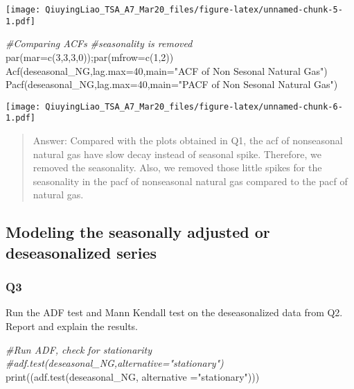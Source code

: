 \documentclass[
]{article}
\newenvironment{Shaded}{\begin{snugshade}}{\end{snugshade}}
\newcommand{\AttributeTok}[1]{\textcolor[rgb]{0.77,0.63,0.00}{#1}}
\newcommand{\CommentTok}[1]{\textcolor[rgb]{0.56,0.35,0.01}{\textit{#1}}}
\newcommand{\DecValTok}[1]{\textcolor[rgb]{0.00,0.00,0.81}{#1}}
\newcommand{\FunctionTok}[1]{\textcolor[rgb]{0.00,0.00,0.00}{#1}}
\newcommand{\NormalTok}[1]{#1}
\newcommand{\StringTok}[1]{\textcolor[rgb]{0.31,0.60,0.02}{#1}}
\begin{document}
\texttt{[image: QiuyingLiao\_TSA\_A7\_Mar20\_files/figure-latex/unnamed-chunk-5-1.pdf]}

\begin{Shaded}
\begin{Highlighting}[]
\CommentTok{\#Comparing ACFs}
\CommentTok{\#seasonality is removed}
\FunctionTok{par}\NormalTok{(}\AttributeTok{mar=}\FunctionTok{c}\NormalTok{(}\DecValTok{3}\NormalTok{,}\DecValTok{3}\NormalTok{,}\DecValTok{3}\NormalTok{,}\DecValTok{0}\NormalTok{));}\FunctionTok{par}\NormalTok{(}\AttributeTok{mfrow=}\FunctionTok{c}\NormalTok{(}\DecValTok{1}\NormalTok{,}\DecValTok{2}\NormalTok{))}
\FunctionTok{Acf}\NormalTok{(deseasonal\_NG,}\AttributeTok{lag.max=}\DecValTok{40}\NormalTok{,}\AttributeTok{main=}\StringTok{"ACF of Non Sesonal Natural Gas"}\NormalTok{)}
\FunctionTok{Pacf}\NormalTok{(deseasonal\_NG,}\AttributeTok{lag.max=}\DecValTok{40}\NormalTok{,}\AttributeTok{main=}\StringTok{"PACF of Non Sesonal Natural Gas"}\NormalTok{)}
\end{Highlighting}
\end{Shaded}

\texttt{[image: QiuyingLiao\_TSA\_A7\_Mar20\_files/figure-latex/unnamed-chunk-6-1.pdf]}

\begin{quote}
Answer: Compared with the plots obtained in Q1, the acf of nonseasonal
natural gas have slow decay instead of seasonal spike. Therefore, we
removed the seasonality. Also, we removed those little spikes for the
seasonality in the pacf of nonseasonal natural gas compared to the pacf
of natural gas.
\end{quote}

\hypertarget{modeling-the-seasonally-adjusted-or-deseasonalized-series}{%
\subsection{Modeling the seasonally adjusted or deseasonalized
series}\label{modeling-the-seasonally-adjusted-or-deseasonalized-series}}

\hypertarget{q3}{%
\subsubsection{Q3}\label{q3}}

Run the ADF test and Mann Kendall test on the deseasonalized data from
Q2. Report and explain the results.

\begin{Shaded}
\begin{Highlighting}[]
\CommentTok{\#Run ADF, check for stationarity}
\CommentTok{\#adf.test(deseasonal\_NG,alternative="stationary")}
\FunctionTok{print}\NormalTok{((}\FunctionTok{adf.test}\NormalTok{(deseasonal\_NG, }\AttributeTok{alternative =}\StringTok{"stationary"}\NormalTok{)))}
\end{Highlighting}
\end{Shaded}
\end{document}
